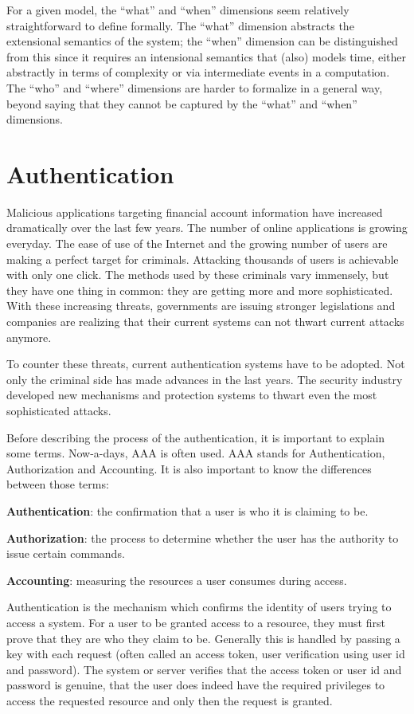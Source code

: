 For a given model, the \enquote{what} and \enquote{when} dimensions seem relatively straightforward to define formally. The \enquote{what} dimension abstracts the extensional semantics
of the system; the \enquote{when} dimension can be distinguished from this since it requires an intensional semantics that (also) models time, either abstractly in terms of complexity
or via intermediate events in a computation. The \enquote{who} and \enquote{where} dimensions are
harder to formalize in a general way, beyond saying that they cannot be captured by the
\enquote{what} and \enquote{when} dimensions.

\section{Authentication}
Malicious applications targeting financial account information have increased dramatically over the last few years. The number of online applications is growing everyday. The ease of use of the Internet and the growing number of users are making a perfect target for criminals. Attacking thousands of users is achievable with only one click. The methods used by these criminals vary immensely, but they have one thing in common: they are getting more and more sophisticated. With these increasing threats, governments are issuing stronger legislations and companies are realizing that their current systems can not thwart current attacks anymore.

To counter these threats, current authentication systems have to be adopted. Not only the criminal side has made advances in the last years. The security industry developed new mechanisms and protection systems to thwart even the most sophisticated attacks.

Before describing the process of the authentication, it is important to explain some terms. Now-a-days, AAA is often used. AAA stands for Authentication, Authorization and Accounting. It is also important to know the differences between those terms:
 
\textbf{Authentication}: the confirmation that a user is who it is claiming to be. 

\textbf{Authorization}: the process to determine whether the user has the authority to issue certain commands.
 
\textbf{Accounting}: measuring the resources a user consumes during access.


Authentication is the mechanism which confirms the identity of users trying to access a system. For a user to be granted access to a resource, they must first prove that they are who they claim to be. Generally this is handled by passing a key with each request (often called an access token, user verification using user id and password). The system or server verifies that the access token or user id and password is genuine, that the user does indeed have the required privileges to access the requested resource and only then the request is granted.

